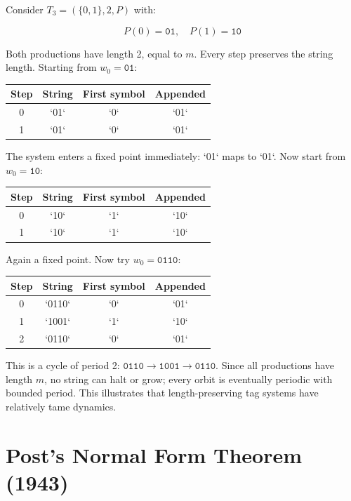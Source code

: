 Consider $T_3 = (\{ 0, 1\} , 2, P)$ with:

\[P(0) = \texttt{01}, \quad P(1) = \texttt{10}\]

Both productions have length 2, equal to $m$. Every step preserves the string length. Starting from $w_0 = \texttt{01}$:

\begin{center}
\begin{tabular}{cccc}
\toprule
Step & String & First symbol & Appended \\
\midrule
0 & `01` & `0` & `01` \\
1 & `01` & `0` & `01` \\
\bottomrule
\end{tabular}
\end{center}

The system enters a fixed point immediately: `01` maps to `01`. Now start from $w_0 = \texttt{10}$:

\begin{center}
\begin{tabular}{cccc}
\toprule
Step & String & First symbol & Appended \\
\midrule
0 & `10` & `1` & `10` \\
1 & `10` & `1` & `10` \\
\bottomrule
\end{tabular}
\end{center}

Again a fixed point. Now try $w_0 = \texttt{0110}$:

\begin{center}
\begin{tabular}{cccc}
\toprule
Step & String & First symbol & Appended \\
\midrule
0 & `0110` & `0` & `01` \\
1 & `1001` & `1` & `10` \\
2 & `0110` & `0` & `01` \\
\bottomrule
\end{tabular}
\end{center}

This is a cycle of period 2: $\texttt{0110} \to \texttt{1001} \to \texttt{0110}$. Since all productions have length $m$, no string can halt or grow; every orbit is eventually periodic with bounded period. This illustrates that length-preserving tag systems have relatively tame dynamics.

\section{Post's Normal Form Theorem (1943)}

